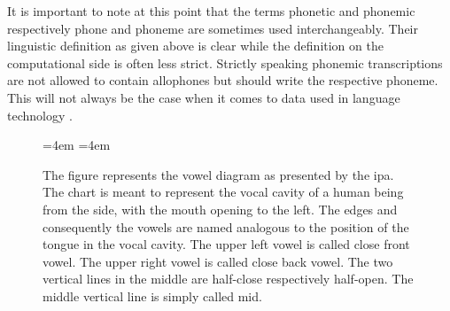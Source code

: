 It is important to note at this point that the terms phonetic and phonemic respectively phone and phoneme are sometimes used interchangeably. Their linguistic definition as given above is clear while the definition on the computational side is often less strict. Strictly speaking phonemic transcriptions are not allowed to contain allophones but should write the respective phoneme. This will not always be the case when it comes to data used in language technology \citep{Lee&Ashby.2020}. 


\begin{figure}[t!]
{\large
\vowelvunit=4em
\vowelhunit=4em
\begin{center}
\begin{vowel}
\end{vowel}
\end{center}}
\caption[Vowel chart]{The figure represents the vowel diagram as presented by the \ac{ipa}. The chart is meant to represent the vocal cavity of a human being from the side, with the mouth opening to the left. The edges and consequently the vowels are named analogous to the position of the tongue in the vocal cavity. The upper left vowel is called close front vowel. The upper right vowel is called close back vowel. The two vertical lines in the middle are half-close respectively half-open. The middle vertical line is simply called mid. }
\label{fig:vowel-diagram}
\end{figure}

